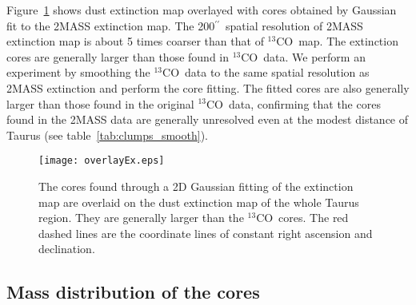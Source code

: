 \documentclass[12pt,preprint]{aastex}
\def\arcsec{\hbox{$^{\prime\prime}$}}
\def\13co{$^{13}$CO}
\begin{document}
Figure~\ref{overlayEx} shows dust extinction map overlayed with cores obtained by Gaussian fit to the 2MASS extinction map. The 200\arcsec\ spatial resolution of
2MASS extinction map is about 5 times coarser than that of \13co\ map. The extinction cores are generally larger than those found in \13co\ data.
We perform an experiment by smoothing the \13co\ data to the same spatial resolution as 2MASS extinction and perform the core fitting. The fitted cores are
also generally larger than those found in the original \13co\ data, confirming that the cores found in the 2MASS data are  generally unresolved even at the
modest distance of Taurus (see table~\ref{tab:clumps_smooth}).
\begin{figure}[htb]
\centering
\texttt{[image: overlayEx.eps]}
\caption{ The cores found through a 2D Gaussian fitting of the extinction map are overlaid on the dust extinction map of the whole Taurus region.  They are generally larger than the \13co\ cores. The red dashed lines are the coordinate lines of constant right ascension and declination. \label{overlayEx}}
\end{figure}




\subsection{Mass distribution of the cores}
\end{document}
